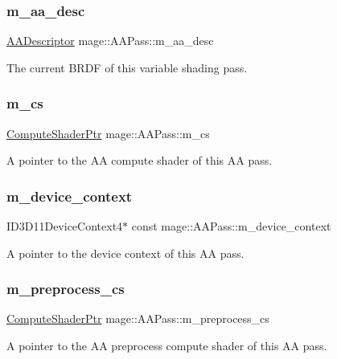 \subsubsection{\texorpdfstring{m\+\_\+aa\+\_\+desc}{m\_aa\_desc}}
{\footnotesize\ttfamily \hyperlink{namespacemage_a0b400065340fa5cca0ce4c2809d91af1}{A\+A\+Descriptor} mage\+::\+A\+A\+Pass\+::m\+\_\+aa\+\_\+desc\hspace{0.3cm}{\ttfamily [private]}}

The current B\+R\+DF of this variable shading pass. \hypertarget{classmage_1_1_a_a_pass_adb906c0dedcbaffb04d28ba41a0d7e9f}{}\label{classmage_1_1_a_a_pass_adb906c0dedcbaffb04d28ba41a0d7e9f} 
\subsubsection{\texorpdfstring{m\+\_\+cs}{m\_cs}}
{\footnotesize\ttfamily \hyperlink{namespacemage_a95ee75d4d07106395d80f751d364dc1b}{Compute\+Shader\+Ptr} mage\+::\+A\+A\+Pass\+::m\+\_\+cs\hspace{0.3cm}{\ttfamily [private]}}

A pointer to the AA compute shader of this AA pass. \hypertarget{classmage_1_1_a_a_pass_ae5a0a1323cfbb03adeb444e2972c7159}{}\label{classmage_1_1_a_a_pass_ae5a0a1323cfbb03adeb444e2972c7159} 
\subsubsection{\texorpdfstring{m\+\_\+device\+\_\+context}{m\_device\_context}}
{\footnotesize\ttfamily I\+D3\+D11\+Device\+Context4$\ast$ const mage\+::\+A\+A\+Pass\+::m\+\_\+device\+\_\+context\hspace{0.3cm}{\ttfamily [private]}}

A pointer to the device context of this AA pass. \hypertarget{classmage_1_1_a_a_pass_a25b8992076f819b52498d3510e499993}{}\label{classmage_1_1_a_a_pass_a25b8992076f819b52498d3510e499993} 
\subsubsection{\texorpdfstring{m\+\_\+preprocess\+\_\+cs}{m\_preprocess\_cs}}
{\footnotesize\ttfamily \hyperlink{namespacemage_a95ee75d4d07106395d80f751d364dc1b}{Compute\+Shader\+Ptr} mage\+::\+A\+A\+Pass\+::m\+\_\+preprocess\+\_\+cs\hspace{0.3cm}{\ttfamily [private]}}

A pointer to the AA preprocess compute shader of this AA pass. 